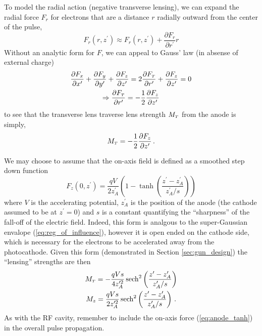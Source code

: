 To model the radial action (negative transverse lensing), we can expand the radial force $F_r$ for electrons that are a distance $r$ radially outward from the center of the pulse,
\begin{equation}
  F_r(r,z^{\prime}) \approx F_r(r,z^{\prime}) + \frac{\partial F_r}{\partial r^{\prime}} r
\end{equation}
Without an analytic form for $F$, we can appeal to Gauss' law (in absense of external charge)
\begin{gather}
  \frac{\partial F_x}{\partial x^{\prime}} + \frac{\partial F_y}{\partial y^{\prime}} + \frac{\partial F_z}{\partial z^{\prime}} = 2 \frac{\partial F_{{\scriptscriptstyle T}}}{\partial r^{\prime}} + \frac{\partial F_z}{\partial z^{\prime}} = 0 \\
  \Rightarrow \frac{\partial F_{{\scriptscriptstyle T}}}{\partial r^{\prime}} = - \frac{1}{2} \frac{\partial F_z}{\partial z^{\prime}}
\end{gather} 
to see that the transverse lens traverse lens strength $M_{{\scriptscriptstyle T}}$ from the anode is simply,
\begin{equation}
  M_{{\scriptscriptstyle T}} = -\frac{1}{2}\frac{\partial F_z}{\partial z^{\prime}} \, \text{.}
\end{equation}

We may choose to assume that the on-axis field is defined as a smoothed step down function
\begin{equation} \label{eq:anode_tanh}
  F_z(0,z^{\prime}) = \frac{qV}{2z^{\prime}_A} \left( 1 - \tanh \left( \frac{ z^{\prime} - z^{\prime}_A }{ z^{\prime}_A / s } \right) \right)
\end{equation}
where $V$ is the accelerating potential, $z^{\prime}_A$ is the position of the anode (the cathode assumed to be at $z^{\prime} = 0$) and $s$ is a constant quantifying the ``sharpness'' of the fall-off of the electric field.
Indeed, this form is analgous to the super-Gaussian envalope (\ref{eq:reg_of_influence}), however it is open ended on the cathode side, which is necessary for the electrons to be accelerated away from the photocathode.
Given this form (demonstrated in Section \ref{sec:gun_design}) the ``lensing'' strengths are then
\begin{gather}
  M_{{\scriptscriptstyle T}} = -\frac{qVs}{4z^{\prime 2}_A} \operatorname{sech}^2 \left( \frac{z^{\prime} - z^{\prime}_A }{ z^{\prime}_A / s } \right) \\
  M_z = \frac{qVs}{2z^{\prime 2}_A} \operatorname{sech}^2 \left( \frac{z^{\prime} - z^{\prime}_A }{ z^{\prime}_A / s } \right) \, \text{.}
\end{gather}
As with the RF cavity, remember to include the on-axis force (\ref{eq:anode_tanh}) in the overall pulse propagation.

